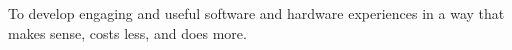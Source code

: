 To develop engaging and useful software and hardware experiences in a way that makes sense, costs less, and does more.
